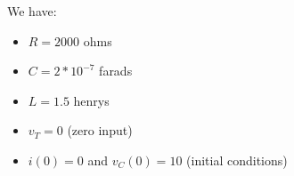\documentclass[preview]{standalone}
\begin{document}
\begin{center}
We have: 
                \begin{itemize}
                  \item $R = 2000$ ohms
                  \item $C = 2 * 10^{-7}$  farads
                  \item $L = 1.5$ henrys
                  \item $v_T = 0$ (zero input)
                  \item $i(0) = 0$ and $v_C(0) = 10$ (initial conditions)
                \end{itemize}
\end{center}
\end{document}
